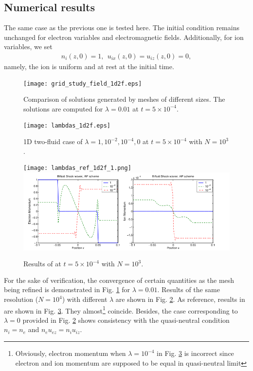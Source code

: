 \documentclass{report}
\begin{document}
\subsection{Numerical results} \label{sec:1d_two_fluid_numerical_results}
The same case as the previous one is tested here. The initial condition remains unchanged for electron variables and electromagnetic fields. Additionally, for ion variables, we set
\begin{align*}
    n_i(z,0) = 1, \ \ u_{ix}(z,0) = u_{iz}(z,0) = 0, 
\end{align*}
namely, the ion is uniform and at rest at the initial time.
\begin{figure}
    \centering
    \texttt{[image: grid\_study\_field\_1d2f.eps]}
    \caption{Comparison of solutions generated by meshes of different sizes. The solutions are computed for $\lambda = 0.01$ at $t = 5 \times 10^{-4}$.}
    \label{fig:grid_study_field_1d2f}
\end{figure}
\begin{figure}
    \centering
    \texttt{[image: lambdas\_1d2f.eps]}
    \caption{1D two-fluid case of $\lambda = 1, 10^{-2}, 10^{-4}, 0$ at $t = 5\times10^{-4}$ with $N = 10^3$.}
    \label{fig:lambdas_1d2f}
\end{figure}
\begin{figure}
    \centering
    \texttt{[image: lambdas\_ref\_1d2f\_1.png]}
    \includegraphics[scale=0.45]{lambdas_ref_1d2f_2.png}
    \caption{Results of \cite{degond_2012} at $t = 5\times10^{-4}$ with $N = 10^3$.}
    \label{fig:lambdas_ref_1d2f}
\end{figure}


For the sake of verification, the convergence of certain quantities as the mesh being refined is demonstrated in Fig. \ref{fig:grid_study_field_1d2f} for $\lambda = 0.01$. Results of the same resolution ($N = 10^4$) with different $\lambda$ are shown in Fig. \ref{fig:lambdas_1d2f}. As reference, results in \cite{degond_2012} are shown in Fig. \ref{fig:lambdas_ref_1d2f}. They almost\footnote{Obviously, electron momentum when $\lambda = 10^{-4}$ in Fig. \ref{fig:lambdas_ref_1d2f} is incorrect since electron and ion momentum are supposed to be equal in quasi-neutral limit} coincide. Besides, the case corresponding to $\lambda = 0$ provided in Fig. \ref{fig:lambdas_1d2f} shows consistency with the quasi-neutral condition $n_i = n_e$ and $n_eu_{ez} = n_iu_{iz}$.
\end{document}
